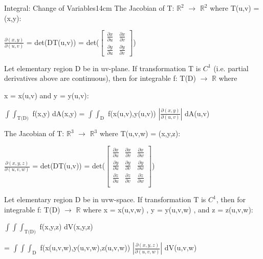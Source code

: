     \newpage



    \begin{wtheorem}{Integral: Change of Variables}{14cm}
        The {\color{lblue} Jacobian} of T: $\mathbb{R}^2$
        $\rightarrow$ $\mathbb{R}^2$ where T(u,v) = (x,y):

        \hspace{0.5cm}
        $\frac{\partial(x,y)}{\partial(u,v)}$
        = det(DT(u,v))
        = det($
        \begin{bmatrix}
            \frac{\partial x}{\partial u} & \frac{\partial x}{\partial v} \\
            \frac{\partial y}{\partial u} & \frac{\partial y}{\partial v}
        \end{bmatrix}
        $)

        Let elementary region D be in uv-plane. If transformation T is
        $C^1$ (i.e. partial derivatives above are continuous),
        then for integrable f: T(D) $\rightarrow$ $\mathbb{R}$
        where
        
        x = x(u,v) and y = y(u,v):

        \hspace{0.5cm}
        $\int \int_\text{T(D)}$ f(x,y) dA(x,y)
        = $\int \int_\text{D}$ f(x(u,v),y(u,v))
            $|\frac{\partial(x,y)}{\partial(u,v)}|$ dA(u,v)

        \vspace{0.5cm}

        The Jacobian of T: $\mathbb{R}^3$
        $\rightarrow$ $\mathbb{R}^3$ where T(u,v,w) = (x,y,z):

        \hspace{0.5cm}
        $\frac{\partial(x,y,z)}{\partial(u,v,w)}$
        = det(DT(u,v))
        = det($
        \begin{bmatrix}
            \frac{\partial x}{\partial u}
            & \frac{\partial x}{\partial v}
            & \frac{\partial x}{\partial w} \\

            \frac{\partial y}{\partial u}
            & \frac{\partial y}{\partial v}
            & \frac{\partial y}{\partial w} \\

            \frac{\partial z}{\partial u}
            & \frac{\partial z}{\partial v}
            & \frac{\partial z}{\partial w} \\
        \end{bmatrix}
        $)

        Let elementary region D be in uvw-space. If transformation T is
        $C^1$, then for integrable f: T(D) $\rightarrow$ $\mathbb{R}$ where
        x = x(u,v,w) , y = y(u,v,w) , and z = z(u,v,w):

        \hspace{0.5cm}
        $\int \int \int_\text{T(D)}$ f(x,y,z) dV(x,y,z)
        
        \hspace{0.5cm}
        = $\int \int \int_\text{D}$ f(x(u,v,w),y(u,v,w),z(u,v,w))
            $|\frac{\partial(x,y,z)}{\partial(u,v,w)}|$ dV(u,v,w)
    \end{wtheorem}

